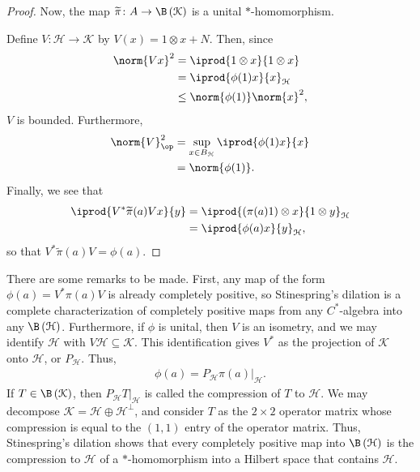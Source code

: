 \documentclass[10pt]{mypackage}
\begin{document}
\begin{proof}
  Now, the map $\widetilde{\pi}\colon A\rightarrow \B\left( \mathcal{K} \right)$ is a unital $\ast$-homomorphism.\newline

  Define $V\colon \mathcal{H}\rightarrow \mathcal{K}$ by $V(x) = 1\otimes x + N$. Then, since
  \begin{align*}
    \norm{Vx}^2 &= \iprod{1\otimes x}{1\otimes x}\\
                &= \iprod{\phi(1)x}{x}_{\mathcal{H}}\\
                &\leq \norm{\phi(1)} \norm{x}^2,
  \end{align*}
  $V$ is bounded. Furthermore,
  \begin{align*}
    \norm{V}_{\op}^2 &= \sup_{x\in B_{\mathcal{H}}} \iprod{\phi(1)x}{x}\\
                     &= \norm{\phi(1)}.
  \end{align*}
  Finally, we see that
  \begin{align*}
    \iprod{V^{\ast}\widetilde{\pi}(a)V x}{y} &= \iprod{\left( \pi(a)1 \right)\otimes x}{1\otimes y}_{\mathcal{H}}\\
                                             &= \iprod{\phi(a)x}{y}_{\mathcal{H}},
  \end{align*}
  so that $V^{\ast}\widetilde{\pi}(a)V = \phi(a)$.
\end{proof}
There are some remarks to be made. First, any map of the form $\phi(a) = V^{\ast}\pi(a)V$ is already completely positive, so Stinespring's dilation is a complete characterization of completely positive maps from any $C^{\ast}$-algebra into any $\B\left( \mathcal{H} \right)$. Furthermore, if $\phi$ is unital, then $V$ is an isometry, and we may identify $\mathcal{H}$ with $V\mathcal{H}\subseteq \mathcal{K}$. This identification gives $V^{\ast}$ as the projection of $\mathcal{K}$ onto $\mathcal{H}$, or $P_{\mathcal{H}}$. Thus,
\begin{align*}
  \phi(a) = P_{\mathcal{H}}\pi(a)|_{\mathcal{H}}.
\end{align*}
If $T\in \B\left( \mathcal{K} \right)$, then $P_{\mathcal{H}}T|_{\mathcal{H}}$ is called the compression of $T$ to $\mathcal{H}$. We may decompose $\mathcal{K} = \mathcal{H}\oplus \mathcal{H}^{\perp}$, and consider $T$ as the $2\times 2$ operator matrix whose compression is equal to the $(1,1)$ entry of the operator matrix. Thus, Stinespring's dilation shows that every completely positive map into $\B\left( \mathcal{H} \right)$ is the compression to $\mathcal{H}$ of a $\ast$-homomorphism into a Hilbert space that contains $\mathcal{H}$.\newline
\end{document}
